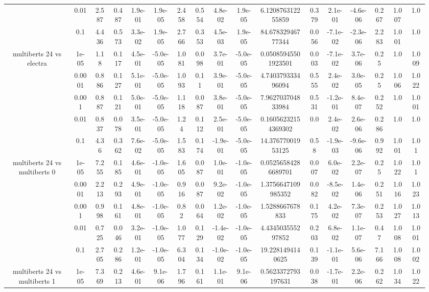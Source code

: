 \begin{tabular}{|c|c|c|c|c|c|c|c|c|c|c|c|c|c|c|c|c|}
 & 0.01 & 2.587 & 0.487 & 1.9e-01 & 1.9e-05 & 2.458 & 0.554 & 4.8e-02 & 1.9e-05 & 6.120876312255859 & 0.379 & 2.1e-01 & -4.6e-06 & 0.267 & 1.007 & 1.0 \\
 & 0.1 & 4.436 & 0.573 & 3.3e-02 & 1.9e-05 & 2.766 & 0.353 & 4.5e-03 & 1.9e-05 & 84.67832946777344 & 0.056 & -7.1e-02 & -2.3e-06 & 2.283 & 1.001 & 1.0 \\
\hline
\multirow{5}{*}{multiberts 24 vs electra } & 1e-05 & 1.18 & 0.117 & 4.5e-01 & -5.0e-05 & 1.081 & 0.098 & 3.7e-01 & -5.0e-05 & 0.05085945501923501 & 0.003 & -7.1e-02 & 3.7e-06 & 0.25 & 1.0 & 1.009 \\
 & 0.0001 & 0.886 & 0.127 & 5.1e-01 & -5.0e-05 & 1.093 & 0.11 & 3.9e-01 & -5.0e-05 & 4.740379333496094 & 0.555 & 2.4e-02 & 3.0e-05 & 0.25 & 1.006 & 1.022 \\
 & 0.001 & 0.887 & 0.121 & 5.0e-01 & -5.0e-05 & 1.118 & 0.087 & 3.8e-01 & -5.0e-05 & 7.962703704833984 & 0.531 & -1.2e-01 & 8.4e-07 & 0.252 & 1.0 & 1.001 \\
 & 0.01 & 0.837 & 0.078 & 3.5e-01 & -5.0e-05 & 1.24 & 0.112 & 2.5e-01 & -5.0e-05 & 0.16056232154369302 & 0.0 & 2.4e-02 & 2.6e-06 & 0.286 & 1.0 & 1.0 \\
 & 0.1 & 4.36 & 0.362 & 7.6e-02 & -5.0e-05 & 1.583 & 0.174 & -1.9e-01 & -5.0e-05 & 14.37677001953125 & 0.58 & -1.9e-03 & -9.6e-06 & 0.992 & 1.001 & 1.01 \\
\hline
\multirow{5}{*}{multiberts 24 vs multiberts 0} & 1e-05 & 7.255 & 0.185 & 4.6e-01 & -1.0e-05 & 1.605 & 0.087 & 1.0e-01 & -1.0e-05 & 0.05256584286689701 & 0.007 & 6.0e-02 & 2.2e-07 & 0.25 & 1.022 & 1.01 \\
 & 0.0001 & 2.213 & 0.293 & 4.9e-01 & -1.0e-05 & 0.916 & 0.087 & 9.2e-02 & -1.0e-05 & 1.3756647109985352 & 0.082 & -8.5e-02 & 1.4e-06 & 0.251 & 1.016 & 1.023 \\
 & 0.001 & 0.998 & 0.161 & 4.8e-01 & -1.0e-05 & 0.82 & 0.064 & 1.2e-02 & -1.0e-05 & 1.5288667678833 & 0.175 & 4.2e-02 & 7.3e-07 & 0.253 & 1.027 & 1.013 \\
 & 0.01 & 0.725 & 0.046 & 3.2e-01 & -1.0e-05 & 1.077 & 0.129 & -1.4e-02 & -1.0e-05 & 4.434503555297852 & 0.203 & 6.8e-02 & 1.1e-07 & 0.47 & 1.008 & 1.001 \\
 & 0.1 & 2.705 & 0.286 & 1.2e-01 & -1.0e-05 & 6.304 & 0.134 & -1.0e-02 & -1.0e-05 & 19.2281494140625 & 0.139 & -1.1e-01 & 5.6e-06 & 7.166 & 1.008 & 1.002 \\
\hline
\multirow{5}{*}{multiberts 24 vs multiberts 1} & 1e-05 & 7.369 & 0.213 & 4.6e-01 & 9.1e-06 & 1.796 & 0.161 & 1.1e-01 & 9.1e-06 & 0.5623372793197631 & 0.038 & -1.7e-01 & 2.2e-06 & 0.262 & 1.034 & 1.022 \\

\end{tabular}
